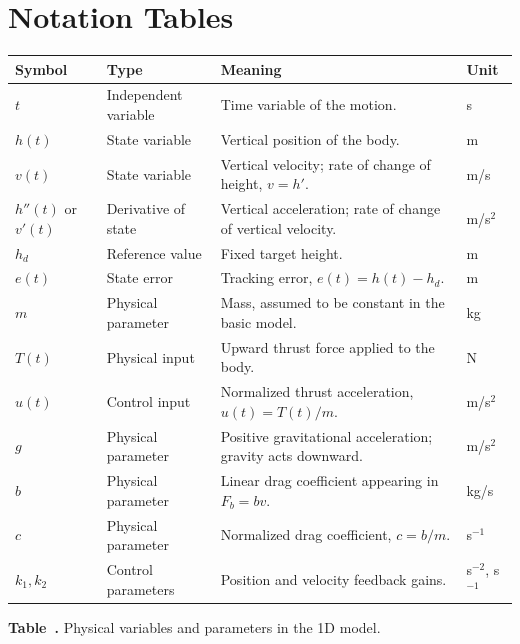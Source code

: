 ﻿\documentclass[12pt]{article}
\begin{document}
\section{Notation Tables}

\begin{center}
\label{tab:1d-notation}
\centering
\renewcommand{\arraystretch}{1.2}
\setlength{\tabcolsep}{3pt}
\begin{tabular}{|>{\centering\arraybackslash}m{1.55cm}
                |>{\raggedright\arraybackslash}m{2.45cm}
                |>{\raggedright\arraybackslash}m{6.2cm}
                |>{\centering\arraybackslash}m{2.2cm}|}
\hline
\textbf{Symbol} & \textbf{Type} & \textbf{Meaning} & \textbf{Unit} \\
\hline
$t$ & Independent variable & Time variable of the motion. & s \\
\hline
$h(t)$ & State variable & Vertical position of the body. & m \\
\hline
$v(t)$ & State variable & Vertical velocity; rate of change of height, $v = h'$. & m/s \\
\hline
$h''(t)$ or $v'(t)$ & Derivative of state & Vertical acceleration; rate of change of vertical velocity. & m/s$^2$ \\
\hline
$h_d$ & Reference value & Fixed target height. & m \\
\hline
$e(t)$ & State error & Tracking error, $e(t) = h(t) - h_d$. & m \\
\hline
$m$ & Physical parameter & Mass, assumed to be constant in the basic model. & kg \\
\hline
$T(t)$ & Physical input & Upward thrust force applied to the body. & N \\
\hline
$u(t)$ & Control input & Normalized thrust acceleration, $u(t) = T(t)/m$. & m/s$^2$ \\
\hline
$g$ & Physical parameter & Positive gravitational acceleration; gravity acts downward. & m/s$^2$ \\
\hline
$b$ & Physical parameter & Linear drag coefficient appearing in $F_b = bv$. & kg/s \\
\hline
$c$ & Physical parameter & Normalized drag coefficient, $c = b/m$. & s$^{-1}$ \\
\hline
$k_1, k_2$ & Control parameters & Position and velocity feedback gains. & s$^{-2}$, s$^{-1}$ \\
\hline
\end{tabular}
\par\smallskip
\textbf{Table~\thetable.} Physical variables and parameters in the 1D model.
\end{center}
\end{document}
